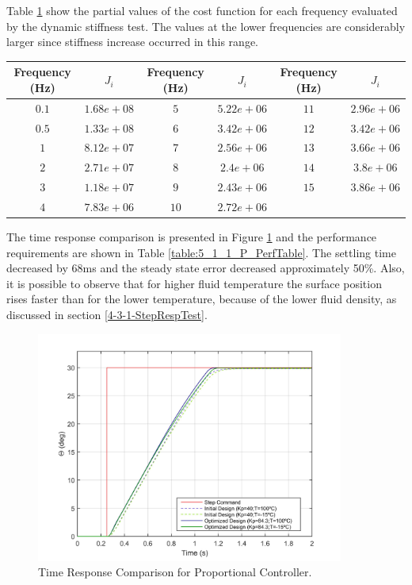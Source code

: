 Table \ref{table:5_1_1_P_CostFunctionTable} show the partial values of the cost function for each frequency evaluated by the dynamic stiffness test. The values at the lower frequencies are considerably larger since stiffness increase occurred in this range. 

\begin{table}[H]
	\label{table:5_1_1_P_CostFunctionTable}
	\centering
	\resizebox{14cm}{!} {
		\begin{tabular}{|c|c|c|c|c|c|}
			\hline
			Frequency (Hz) & $J_i$ & Frequency (Hz) & $J_i$ & Frequency (Hz) & $J_i$ \\ \hline
			$0.1$ & $1.68e+08$ & $5$ & $5.22e+06$ & $11$ & $2.96e+06$ \\ \hline
			$0.5$ & $1.33e+08$ & $6$ & $3.42e+06$ & $12$ & $3.42e+06$ \\ \hline
			$1$ & $8.12e+07$ & $7$ & $2.56e+06$ & $13$ & $3.66e+06$ \\ \hline
			$2$ & $2.71e+07$ & $8$ & $2.4e+06$ & $14$ & $3.8e+06$ \\ \hline
			$3$ & $1.18e+07$ & $9$ & $2.43e+06$ & $15$ & $3.86e+06$ \\ \hline
			$4$ & $7.83e+06$ & $10$ & $2.72e+06$ &  &  \\ \hline
	\end{tabular}}
\end{table}

The time response comparison is presented in Figure \ref{fig:5_1_1_P_TimeResp} and the performance requirements are shown in Table \ref{table:5_1_1_P_PerfTable}. The settling time decreased by 68ms and the steady state error decreased approximately 50\%. Also, it is possible to observe that for higher fluid temperature the surface position rises faster than for the lower temperature, because of the lower fluid density, as discussed in section \ref{4-3-1-StepRespTest}.

\begin{figure}[H]
	\centering
	\centerline{\includegraphics[width=0.9\textwidth]{Figuras/5.OptimizationResults/5-1-1-P-TimeResponseComparison.jpg}}
	\caption{Time Response Comparison for Proportional Controller.}
	\label{fig:5_1_1_P_TimeResp}
\end{figure}

